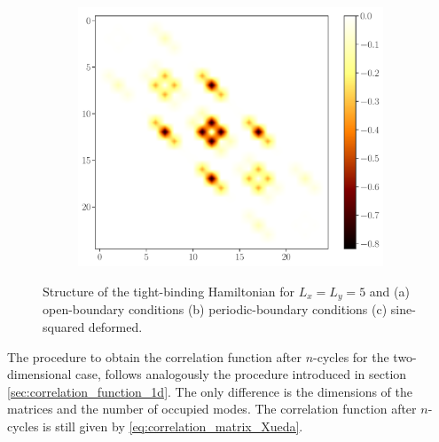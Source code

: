 \documentclass[11pt, a4paper, oneside]{book}
\theoremstyle{definition} %
\begin{document}
\begin{figure}[h]
\begin{subfigure}[b]{0.31\textwidth}
			\includegraphics[width = \textwidth]{ColorMapMatrix_SSD_2D}	
			\caption{}
		\end{subfigure}
		\caption{Structure of the tight-binding Hamiltonian for $L_x = L_y = 5$ and (a) open-boundary conditions (b) periodic-boundary conditions (c) sine-squared deformed.}
\end{figure}
The procedure to obtain the correlation function after $n$-cycles for the two-dimensional case, follows analogously the procedure introduced in section \ref{sec:correlation_function_1d}. The only difference is the dimensions of the matrices and the number of occupied modes. The correlation function after $n$-cycles is still given by \ref{eq:correlation_matrix_Xueda}. 
\end{document}
